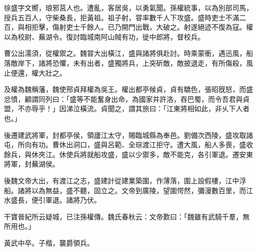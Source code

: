 
\begin{pinyinscope}
徐盛字文嚮，琅邪莒人也。遭亂，客居吳，以勇氣聞。孫權統事，以為別部司馬，授兵五百人，守柴桑長，拒黃祖。祖子射，甞率數千人下攻盛。盛時吏士不滿二百，與相拒擊，傷射吏士千餘人。已乃開門出戰，大破之。射遂絕迹不復為寇。權以為校尉、蕪湖令。復討臨城南阿山賊有功，徙中郎將，督校兵。

曹公出濡須，從權禦之。魏甞大出橫江，盛與諸將俱赴討。時乘蒙衝，遇迅風，船落敵岸下，諸將恐懼，未有出者，盛獨將兵，上突斫敵，敵披退走，有所傷殺，風止便還，權大壯之。

及權為魏稱藩，魏使邢貞拜權為吳王。權出都亭候貞，貞有驕色，張昭旣怒，而盛忿憤，顧謂同列曰：「盛等不能奮身出命，為國家并許洛，吞巴蜀，而令吾君與貞盟，不亦辱乎！」因涕泣橫流。貞聞之，謂其旅曰：「江東將相如此，非乆下人者也。」

後遷建武將軍，封都亭侯，領廬江太守，賜臨城縣為奉邑。劉備次西陵，盛攻取諸屯，所向有功。曹休出洞口，盛與呂範、全琮渡江拒守。遭大風，船人多喪，盛收餘兵，與休夾江。休使兵將就船攻盛，盛以少禦多，敵不能克，各引軍退。遷安東將軍，封蕪湖侯。

後魏文帝大出，有渡江之志，盛建計從建業築圍，作薄落，圍上設假樓，江中浮船。諸將以為無益，盛不聽，固立之。文帝到廣陵，望圍愕然，彌漫數百里，而江水盛長，便引軍退。諸將乃伏。

干寶晉紀所云疑城，已注孫權傳。魏氏春秋云：文帝歎曰：「魏雖有武騎千羣，無所用也。」

黃武中卒。子楷，襲爵領兵。


\end{pinyinscope}